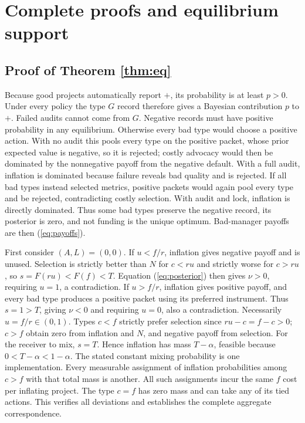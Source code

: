 \documentclass[11pt]{article}
\begin{document}
{\begin{enumerate}
\end{enumerate}

}
\clearpage
\appendix
\section{Complete proofs and equilibrium support}\label{app:proofs}
\subsection{Proof of Theorem \ref{thm:eq}}\label{app:eq}
Because good projects automatically report $+$, its probability is at least $p>0$. Under every policy the type $G$ record therefore gives a Bayesian contribution $p$ to $+$. Failed audits cannot come from $G$. Negative records must have positive probability in any equilibrium. Otherwise every bad type would choose a positive action. With no audit this pools every type on the positive packet, whose prior expected value is negative, so it is rejected; costly advocacy would then be dominated by the nonnegative payoff from the negative default. With a full audit, inflation is dominated because failure reveals bad quality and is rejected. If all bad types instead selected metrics, positive packets would again pool every type and be rejected, contradicting costly selection. With audit and lock, inflation is directly dominated. Thus some bad types preserve the negative record, its posterior is zero, and not funding is the unique optimum. Bad-manager payoffs are then (\ref{eq:payoffs}).

First consider $(A,L)=(0,0)$. If $u<f/r$, inflation gives negative payoff and is unused. Selection is strictly better than $N$ for $c<ru$ and strictly worse for $c>ru$, so $s=F(ru)<F(f)<T$. Equation (\ref{eq:posterior}) then gives $\nu>0$, requiring $u=1$, a contradiction. If $u>f/r$, inflation gives positive payoff, and every bad type produces a positive packet using its preferred instrument. Thus $s=1>T$, giving $\nu<0$ and requiring $u=0$, also a contradiction. Necessarily $u=f/r\in(0,1)$. Types $c<f$ strictly prefer selection since $ru-c=f-c>0$; $c>f$ obtain zero from inflation and $N$, and negative payoff from selection. For the receiver to mix, $s=T$. Hence inflation has mass $T-\alpha$, feasible because $0<T-\alpha<1-\alpha$. The stated constant mixing probability is one implementation. Every measurable assignment of inflation probabilities among $c>f$ with that total mass is another. All such assignments incur the same $f$ cost per inflating project. The type $c=f$ has zero mass and can take any of its tied actions. This verifies all deviations and establishes the complete aggregate correspondence.
\end{document}
